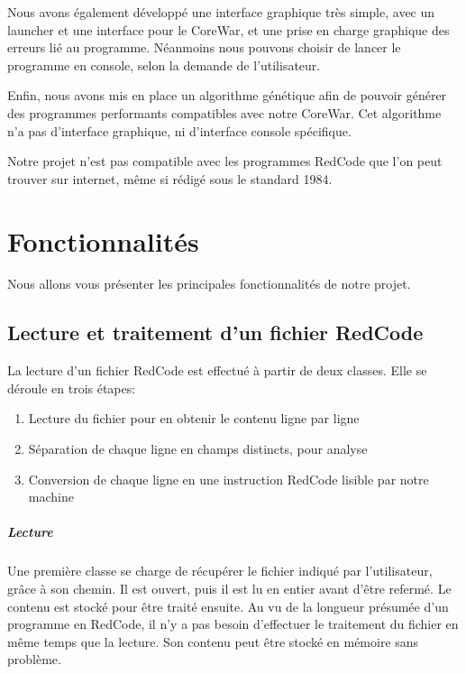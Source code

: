 \documentclass[hidelinks]{report}
\begin{document}
Nous avons également développé une interface graphique très simple, avec un launcher et une interface pour le CoreWar, et une prise en charge graphique des erreurs lié au programme. Néanmoins nous pouvons choisir de lancer le programme en console, selon la demande de l'utilisateur.

Enfin, nous avons mis en place un algorithme génétique afin de pouvoir générer des programmes performants compatibles avec notre CoreWar. Cet algorithme n'a pas d'interface graphique, ni d'interface console spécifique.

Notre projet n'est pas compatible avec les programmes RedCode que l'on peut trouver sur internet, même si rédigé sous le standard 1984.

\chapter{Fonctionnalités\label{chap:2}}
Nous allons vous présenter les principales fonctionnalités de notre projet.
\section{Lecture et traitement d'un fichier RedCode}
La lecture d'un fichier RedCode est effectué à partir de deux classes.
Elle se déroule en trois étapes:
\begin{enumerate}
    \item Lecture du fichier pour en obtenir le contenu ligne par ligne
    \item Séparation de chaque ligne en champs distincts, pour analyse
    \item Conversion de chaque ligne en une instruction RedCode lisible par notre machine
\end{enumerate}
    
\paragraph{Lecture}
Une première classe se charge de récupérer le fichier indiqué par l'utilisateur, grâce à son chemin. Il est ouvert, puis il est lu en entier avant d'être refermé. Le contenu est stocké pour être traité ensuite. Au vu de la longueur présumée d'un programme en RedCode, il n'y a pas besoin d'effectuer le traitement du fichier en même temps que la lecture. Son contenu peut être stocké en mémoire sans problème.
\end{document}
